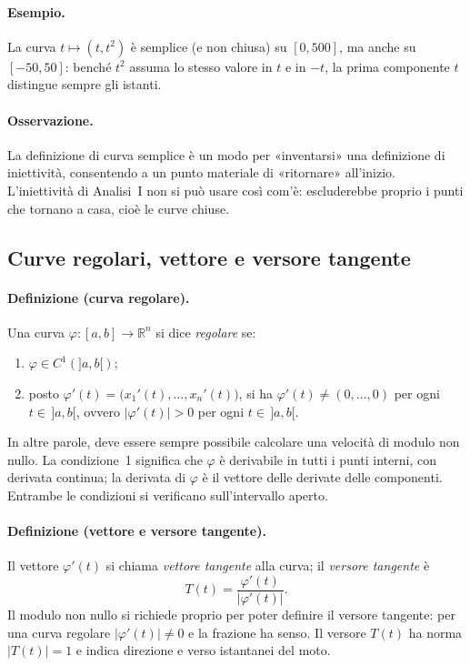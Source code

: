 \paragraph{Esempio.} La curva $t\mapsto(t,t^2)$ è semplice (e non chiusa) su $[0,500]$,
ma anche su $[-50,50]$: benché $t^2$ assuma lo stesso valore in $t$ e in $-t$, la prima
componente $t$ distingue sempre gli istanti.

\paragraph{Osservazione.} La definizione di curva semplice è un modo per «inventarsi» una
definizione di iniettività, consentendo a un punto materiale di «ritornare» all'inizio.
L'iniettività di Analisi~I non si può usare così com'è: escluderebbe proprio i punti che
tornano a casa, cioè le curve chiuse.

\subsection{Curve regolari, vettore e versore tangente}

\paragraph{Definizione (curva regolare).} Una curva $\varphi\colon[a,b]\to\mathbb{R}^n$ si
dice \emph{regolare} se:
\begin{enumerate}
\item $\varphi\in C^1(]a,b[)$;
\item posto $\varphi'(t)=\bigl(x_1'(t),\dots,x_n'(t)\bigr)$, si ha
$\varphi'(t)\neq(0,\dots,0)$ per ogni $t\in\,]a,b[$, ovvero $|\varphi'(t)|>0$ per ogni
$t\in\,]a,b[$.
\end{enumerate}
In altre parole, deve essere sempre possibile calcolare una velocità di modulo non
nullo.
La condizione~1 significa che $\varphi$ è derivabile in tutti i punti interni, con
derivata continua; la derivata di $\varphi$ è il vettore delle derivate delle componenti.
Entrambe le condizioni si verificano sull'intervallo aperto.

\paragraph{Definizione (vettore e versore tangente).} Il vettore $\varphi'(t)$ si chiama
\emph{vettore tangente} alla curva; il \emph{versore tangente} è
\[
T(t)=\frac{\varphi'(t)}{|\varphi'(t)|}.
\]
Il modulo non nullo si richiede proprio per poter definire il versore tangente: per una
curva regolare $|\varphi'(t)|\neq0$ e la frazione ha senso. Il versore $T(t)$ ha norma
$|T(t)|=1$ e indica direzione e verso istantanei del moto.

